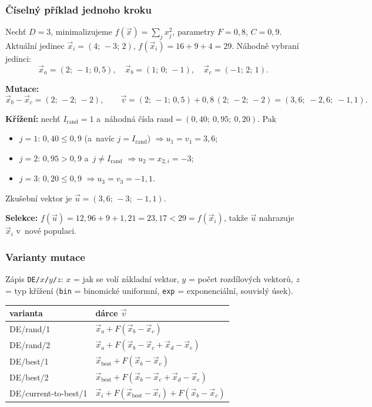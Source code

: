 \documentclass[11pt,a4paper]{article}
\theoremstyle{definition}
\begin{document}
\subsubsection{Číselný příklad jednoho kroku}

Nechť $D = 3$, minimalizujeme $f(\vec x) = \sum_j x_j^2$, parametry
$F = 0{,}8$, $C = 0{,}9$. Aktuální jedinec
$\vec x_i = (4;\, -3;\, 2)$, $f(\vec x_i) = 16+9+4 = 29$.
Náhodně vybraní jedinci:
\[
\vec x_a = (2;\, -1;\, 0{,}5), \quad
\vec x_b = (1;\, 0;\, -1), \quad
\vec x_c = (-1;\, 2;\, 1).
\]

\textbf{Mutace:}
\[
\vec x_b - \vec x_c = (2;\, -2;\, -2), \qquad
\vec v = (2;\,-1;\,0{,}5) + 0{,}8\,(2;\,-2;\,-2) = (3{,}6;\; -2{,}6;\; -1{,}1).
\]

\textbf{Křížení:} nechť $I_{\mathrm{rand}} = 1$ a~náhodná čísla
$\mathrm{rand} = (0{,}40;\ 0{,}95;\ 0{,}20)$. Pak
\begin{itemize}
\item $j=1$: $0{,}40 \le 0{,}9$ (a~navíc $j = I_{\mathrm{rand}}$) $\Rightarrow u_1 = v_1 = 3{,}6$;
\item $j=2$: $0{,}95 > 0{,}9$ a~$j \ne I_{\mathrm{rand}}$ $\Rightarrow u_2 = x_{2,i} = -3$;
\item $j=3$: $0{,}20 \le 0{,}9$ $\Rightarrow u_3 = v_3 = -1{,}1$.
\end{itemize}
Zkušební vektor je $\vec u = (3{,}6;\, -3;\, -1{,}1)$.

\textbf{Selekce:} $f(\vec u) = 12{,}96 + 9 + 1{,}21 = 23{,}17 < 29 = f(\vec x_i)$,
takže $\vec u$ nahrazuje $\vec x_i$ v~nové populaci.

\subsubsection{Varianty mutace}

Zápis \texttt{DE/$x$/$y$/$z$}: $x$ = jak se volí základní vektor,
$y$ = počet rozdílových vektorů, $z$ = typ křížení (\texttt{bin} = binomické
uniformní, \texttt{exp} = exponenciální, souvislý úsek).

\begin{center}
\begin{tabular}{@{}ll@{}}
\toprule
\textbf{varianta} & \textbf{dárce $\vec v$} \\
\midrule
DE/rand/1 & $\vec x_a + F(\vec x_b - \vec x_c)$ \\
DE/rand/2 & $\vec x_a + F(\vec x_b - \vec x_c + \vec x_d - \vec x_e)$ \\
DE/best/1 & $\vec x_{\mathrm{best}} + F(\vec x_b - \vec x_c)$ \\
DE/best/2 & $\vec x_{\mathrm{best}} + F(\vec x_b - \vec x_c + \vec x_d - \vec x_e)$ \\
DE/current-to-best/1 & $\vec x_i + F(\vec x_{\mathrm{best}} - \vec x_i) + F(\vec x_b - \vec x_c)$ \\
\bottomrule
\end{tabular}
\end{center}
\end{document}

